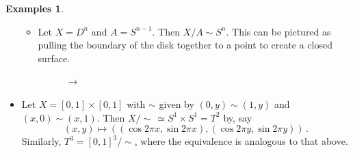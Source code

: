 \documentclass[a4paper,11pt]{article}
\theoremstyle{definition}
\newtheorem*{exs}{Examples}
\numberwithin{equation}{section}
\begin{document}
\begin{exs}
\begin{itemize}
\begin{itemize}
        \item Let $X=D^n$ and $A=S^{n-1}$. Then $X/A\sim S^n$. This can be pictured as pulling the boundary of the disk together to a point to create a closed surface.
        
        \begin{figure}[h]
            \centering
            \begin{minipage}{.47\textwidth}
            \centering
            \end{minipage}
            \LARGE$\rightarrow$
            \begin{minipage}{.47\textwidth}
            \centering
            \end{minipage}
        \end{figure}
    \end{itemize}
    \item Let $X=[0,1]\times[0,1]$ with $\sim$ given by $(0,y)\sim(1,y)$ and $(x,0)\sim(x,1)$. Then $X/\sim\,\simeq S^1\times S^1=T^2$ by, say
        \[
        (x,y)\mapsto\left((\cos2\pi x,\sin2\pi x),(\cos2\pi y,\sin2\pi y)\right)\,.
        \]
        Similarly, $T^3=[0,1]^3/\sim$, where the equivalence is analogous to that above.
        

\end{itemize}
\end{exs}
\end{document}
